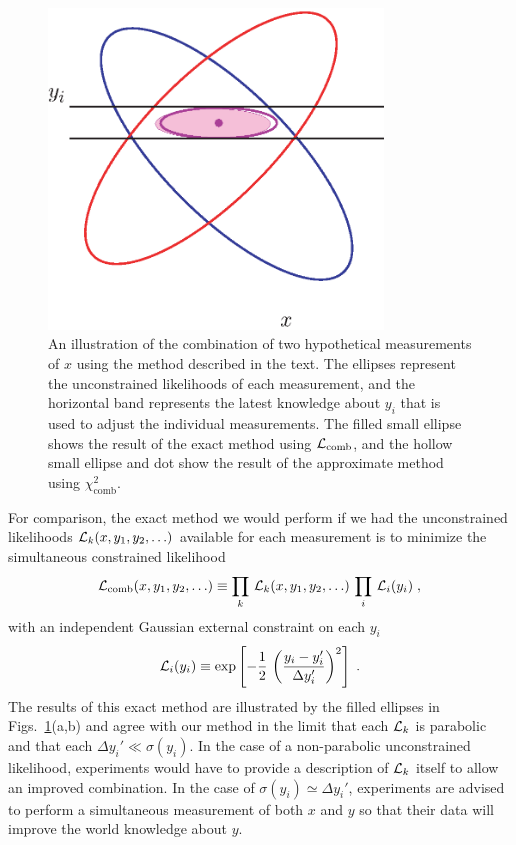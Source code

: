 \begin{figure}
\begin{center}
\includegraphics[width=3.5in]{figures/meth/figure3.eps}
\end{center}
\caption{An illustration of the combination of two hypothetical
  measurements of $x$ using the method described in the text. The
  ellipses represent the unconstrained likelihoods of each measurement,
  and the horizontal band represents the latest knowledge about $y_i$ 
  that is used to adjust the individual measurements. The filled small
  ellipse shows the result of the exact method using 
  ${\cal L}_{\text{comb}}$, and the hollow small ellipse and dot show 
  the result of the approximate method using $\chi^2_{\text{comb}}$.}
\label{fig:fit12}
\end{figure}

For comparison, the exact method we would
perform if we had the unconstrained likelihoods ${\cal L}_k(x,y_1,y_2,\ldots)$
available for each
measurement is to minimize the simultaneous constrained likelihood
\begin{equation}
{\cal L}_{\text{comb}}(x,y_1,y_2,\ldots) \equiv \prod_k\,{\cal
  L}_k(x,y_1,y_2,\ldots)\,\prod_{i}\,{\cal 
  L}_i(y_i) \; ,
\end{equation}
with an independent Gaussian external constraint on each $y_i$
\begin{equation}
{\cal L}_i(y_i) \equiv \exp\left[-\frac{1}{2}\,\left(\frac{y_i-y_i'}{\Delta
 y_i'}\right)^2\right] \; .
\end{equation}
The results of this exact method are illustrated by the filled ellipses
in Figs.~\ref{fig:fit12}(a,b) and agree with our method in the limit that
each ${\cal L}_k$ is parabolic and that each $\Delta
y_i' \ll \sigma(y_i)$. In the case of a non-parabolic unconstrained
likelihood, experiments would have to provide a description of ${\cal
  L}_k$ itself to allow an improved combination. In the case of
$\sigma(y_i)\simeq \Delta y_i'$, experiments are advised to perform a
simultaneous measurement of both $x$ and $y$ so that their data will
improve the world knowledge about $y$. 

